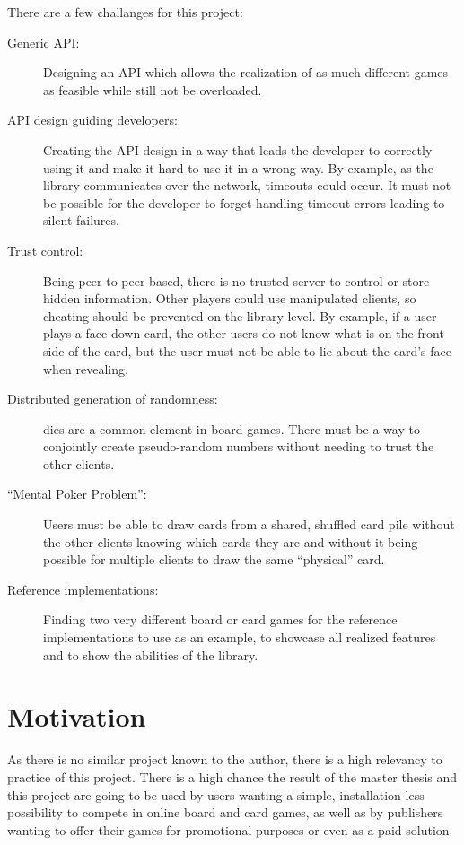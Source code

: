 There are a few challanges for this project:

\begin{description}
  \item[Generic \gls{API}:] Designing an \gls{API} which allows the realization
  of as much different games as feasible while still not be overloaded.
  \item[\gls{API} design guiding developers:] Creating the \gls{API} design in a
  way that leads the developer to correctly using it and make it hard to use it
  in a wrong way. By example, as the library communicates over the network,
  timeouts could occur. It must not be possible for the developer to forget
  handling timeout errors leading to silent failures.
  \item[Trust control:] Being \gls{peer-to-peer} based, there is no trusted
  server to control or store \gls{hidden information}. Other players could use
  manipulated clients, so cheating should be prevented on the library level.
  By example, if a user plays a \gls{face}-down card, the other users
  do not know what is on the front side of the card, but the user must not be
  able to lie about the card's \gls{face} when revealing.
  \item[Distributed generation of randomness:] \Glspl{die} are a common element
  in board games. There must be a way to conjointly create pseudo-random numbers
  without needing to trust the other clients.
  \item[``Mental Poker Problem'':] Users must be able to draw cards from a
  shared, shuffled card pile without the other clients knowing which cards they
  are and without it being possible for multiple clients to draw the same
  ``physical'' card.
  \item[Reference implementations:] Finding two very different board or card
  games for the reference implementations to use as an example, to showcase all
  realized features and to show the abilities of the library.
\end{description}

\section{Motivation}

As there is no similar project known to the author, there is a high relevancy to
practice of this project. There is a high chance the result of the master thesis
and this project are going to be used by users wanting a simple,
installation-less possibility to compete in online board and card games, as well
as by publishers wanting to offer their games for promotional purposes or even
as a paid solution.

